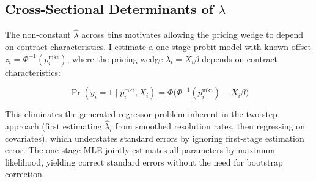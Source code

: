 \documentclass[12pt,a4paper]{article}
\begin{document}
\subsection{\texorpdfstring{Cross-Sectional Determinants of
\(\lambda\)}{Cross-Sectional Determinants of lambda}}\label{cross-sectional-determinants-of-lambda}

The non-constant \(\hat{\lambda}\) across bins motivates allowing the
pricing wedge to depend on contract characteristics. I estimate a
one-stage probit model with known offset
\(z_i = \Phi^{-1}(p_i^{\text{mkt}})\), where the pricing wedge
\(\lambda_i = X_i\beta\) depends on contract characteristics:

\[\Pr(y_i = 1 \mid p_i^{\text{mkt}}, X_i) = \Phi\!\bigl(\Phi^{-1}(p_i^{\text{mkt}}) - X_i\beta\bigr)\]

This eliminates the generated-regressor problem inherent in the two-step
approach (first estimating \(\hat{\lambda}_i\) from smoothed resolution
rates, then regressing on covariates), which understates standard errors
by ignoring first-stage estimation error. The one-stage MLE jointly
estimates all parameters by maximum likelihood, yielding correct
standard errors without the need for bootstrap correction.
\end{document}
